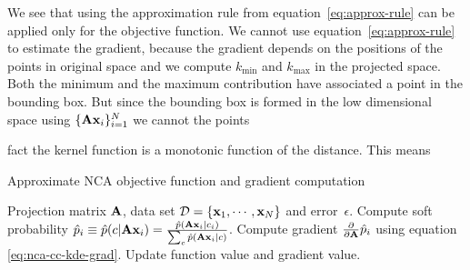 We see that using the approximation rule from equation~\eqref{eq:approx-rule} can be applied only for the objective function. We cannot use equation~\eqref{eq:approx-rule} to estimate the gradient, because the gradient depends on the positions of the points in original space and we compute $k_{\min}$ and $k_{\max}$ in the projected space. Both the minimum and the maximum contribution have associated a point in the bounding box. But since the bounding box is formed in the low dimensional space using $\{\mathbf{A}\mathbf{x}_i\}_{i=1}^N$ we cannot the points 

fact the kernel function is a monotonic function of the distance. This means %
	
	\begin{algorithm}
		\caption{Approximate NCA objective function and gradient computation} 
		\label{alg:cc-kde-nca}  
		\begin{algorithmic}[1]                    %
			\REQUIRE Projection matrix $\mathbf{A}$, data set
$\mathcal{D}=\{\mathbf{x}_1,\cdots,\mathbf{x}_N\}$ and error~$\epsilon$.
			\ENDFOR 
				\ENDFOR
				\STATE Compute soft probability $\hat{p}_i \equiv \hat{p}(c|\mathbf{A}\mathbf{x}_i) =
\frac{\hat{p}(\mathbf{A}\mathbf{x}_i|c_i)}{\sum_{c}\hat{p}(\mathbf{A}\mathbf{x}_i|c)}$.
				\STATE Compute gradient $\frac{\partial}{\partial \mathbf{A}} \hat{p}_i$ using
equation \eqref{eq:nca-cc-kde-grad}.
				\STATE Update function value and gradient value.
			\ENDFOR
		\end{algorithmic}
	\end{algorithm}
	
